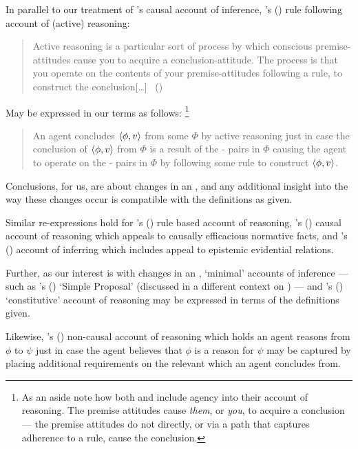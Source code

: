 \begin{note}
  In parallel to our treatment of \citeauthor{Armstrong:1968vh}'s causal account of inference, \citeauthor{Broome:2002aa}'s (\citeyear{Broome:2013aa}) rule following account of (active) reasoning:
  \begin{quote}
    Active reasoning is a particular sort of process by which conscious premise-attitudes cause you to acquire a conclusion-attitude.
    The process is that you operate on the contents of your premise-attitudes following a rule, to construct the conclusion[\dots]
    \mbox{ }\hfill\mbox{(\citeyear[234]{Broome:2002aa})}
  \end{quote}
  May be expressed in our terms as follows:%
  \footnote{
    As an aside note how both \citeauthor{Armstrong:1968vh} and \citeauthor{Broome:2002aa} include agency into their account of reasoning.
    The premise attitudes cause \emph{them}, or \emph{you}, to acquire a conclusion --- the premise attitudes do not directly, or via a path that captures adherence to a rule, cause the conclusion.
  }
  \begin{quote}
    An agent concludes \(\langle\phi, v\rangle\) from some \pool{} \(\Phi\) by active reasoning just in case the \agents{} conclusion of \(\langle\phi, v\rangle\) from \(\Phi\) is a result of the - pairs in \(\Phi\) causing the agent to operate on the - pairs in \(\Phi\) by following some rule to construct \(\langle\phi, v\rangle\).
  \end{quote}
  Conclusions, for us, are about changes in an \agpe{}, and any additional insight into the way these changes occur is compatible with the definitions as given.

  Similar re-expressions hold for \citeauthor{Boghossian:2014aa}'s (\citeyear{Boghossian:2008vf,Boghossian:2014aa}) rule based account of reasoning, \citeauthor{Wedgwood:2006ui}'s (\citeyear{Wedgwood:2006ui}) causal account of reasoning which appeals to causally efficacious normative facts, and \citeauthor{Longino:1978wv}'s (\citeyear{Longino:1978wv}) account of inferring which includes appeal to epistemic evidential relations.
\end{note}


\begin{note}
  Further, as our interest is with changes in an \agpe{}, `minimal' accounts of inference --- such as \citeauthor{Wright:2014tt}'s (\citeyear{Wright:2014tt}) `Simple Proposal' (discussed in a different context on ) --- and \cite{Valaris:2014un}'s (\citeyear{Valaris:2014un}) `constitutive' account of reasoning may be expressed in terms of the definitions given.

  Likewise, \citeauthor{Thomson:1965vv}'s (\citeyear{Thomson:1965vv}) non-causal account of reasoning which holds an agent reasons from \(\phi\) to \(\psi\) just in case the agent believes that \(\phi\) is a reason for \(\psi\) may be captured by placing additional requirements on the relevant \pool{} which an agent concludes from.
\end{note}



